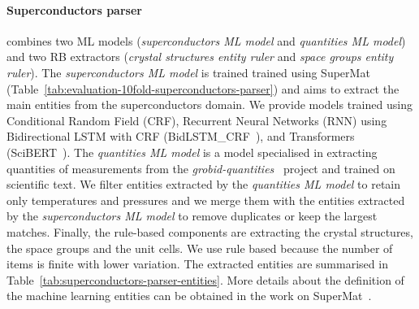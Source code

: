 \documentclass{article}
\begin{document}
\paragraph{Superconductors parser} combines two ML models (\textit{superconductors ML model} and \textit{quantities ML model}) and two RB extractors (\textit{crystal structures entity ruler} and \textit{space groups entity ruler}). 
The \textit{superconductors ML model} is trained trained using SuperMat~\cite{foppiano2021supermat} (Table~\ref{tab:evaluation-10fold-superconductors-parser}) and aims to extract the main entities from the superconductors domain.
We provide models trained using Conditional Random Field (CRF), Recurrent Neural Networks (RNN) using Bidirectional LSTM with CRF (BidLSTM\_CRF~\cite{Lample2016NeuralAF}), and Transformers (SciBERT~\cite{Beltagy2019SciBERT}).
The \textit{quantities ML model} is a model specialised in extracting quantities of measurements from the \textit{grobid-quantities}~\cite{foppiano2019quantities} project and trained on scientific text.
We filter entities extracted by the \textit{quantities ML model} to retain only temperatures and pressures and we merge them with the entities extracted by the \textit{superconductors ML model} to remove duplicates or keep the largest matches.
Finally, the rule-based components are extracting the crystal structures, the space groups and the unit cells. We use rule based because the number of items is finite with lower variation.  
The extracted entities are summarised in Table~\ref{tab:superconductors-parser-entities}. More details about the definition of the machine learning entities can be obtained in the work on SuperMat~\cite{foppiano2021supermat}.
\end{document}
